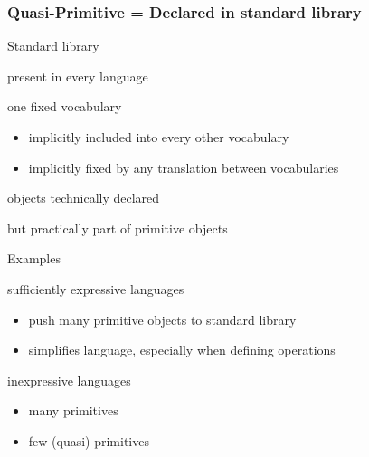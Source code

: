 \documentclass{beamer}
\begin{document}
\begin{frame}\frametitle{Quasi-Primitive = Declared in standard library}
\begin{blockitems}{Standard library}
 \item present in every language
 \item one fixed vocabulary
  \begin{itemize}
  \item implicitly included into every other vocabulary
  \item implicitly fixed by any translation between vocabularies
  \end{itemize}
 \item objects technically declared
 \item but practically part of primitive objects
\end{blockitems}

\begin{blockitems}{Examples}
\item sufficiently expressive languages
 \begin{itemize}
 \item push many primitive objects to standard library 
 \item simplifies language, especially when defining operations
 \end{itemize}
\item inexpressive languages
\begin{itemize}
\item many primitives 
\item few (quasi)-primitives 
\end{itemize}
\end{blockitems}
\end{frame}
\end{document}
